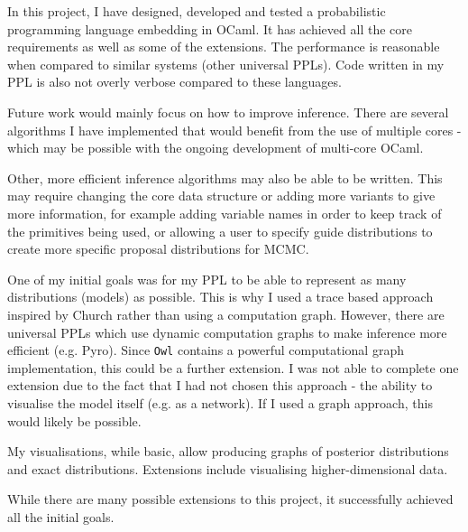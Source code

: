 
In this project, I have designed, developed and tested a probabilistic programming language embedding in OCaml. It has achieved all the core requirements as well as some of the extensions. The performance is reasonable when compared to similar systems (other universal PPLs). Code written in my PPL is also not overly verbose compared to these languages.

Future work would mainly focus on how to improve inference. There are several algorithms I have implemented that would benefit from the use of multiple cores - which may be possible with the ongoing development of multi-core OCaml. 

Other, more efficient inference algorithms may also be able to be written. This may require changing the core data structure or adding more variants to give more information, for example adding variable names in order to keep track of the primitives being used, or allowing a user to specify guide distributions to create more specific proposal distributions for MCMC.

One of my initial goals was for my PPL to be able to represent as many distributions (models) as possible. This is why I used a trace based approach inspired by Church rather than using a computation graph. However, there are universal PPLs which use dynamic computation graphs to make inference more efficient (e.g. Pyro). Since \texttt{Owl} contains a powerful computational graph implementation, this could be a further extension. I was not able to complete one extension due to the fact that I had not chosen this approach - the ability to visualise the model itself (e.g. as a network). If I used a graph approach, this would likely be possible.

My visualisations, while basic, allow producing graphs of posterior distributions and exact distributions. Extensions include visualising higher-dimensional data.

While there are many possible extensions to this project, it successfully achieved all the initial goals.